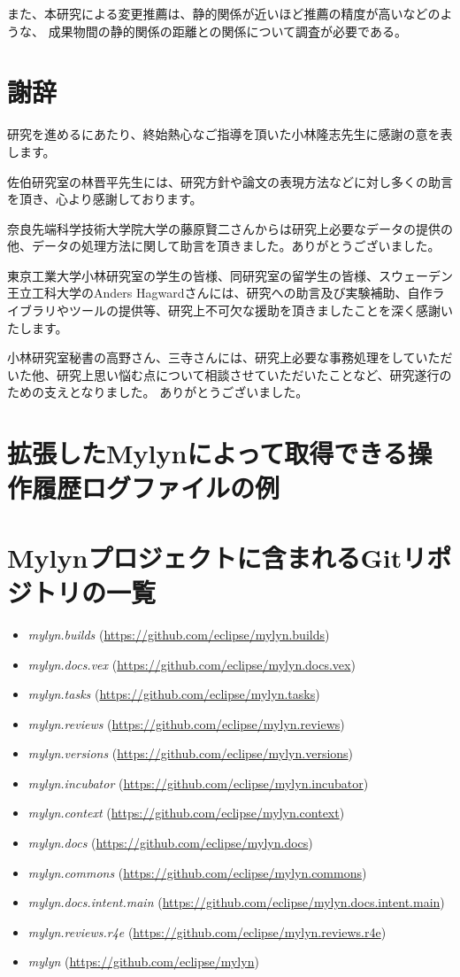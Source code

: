 \documentclass[a4paper]{jsbook}
\begin{document}
また、本研究による変更推薦は、静的関係が近いほど推薦の精度が高いなどのような、
成果物間の静的関係の距離との関係について調査が必要である。

\chapter*{謝辞}
研究を進めるにあたり、終始熱心なご指導を頂いた小林隆志先生に感謝の意を表します。

佐伯研究室の林晋平先生には、研究方針や論文の表現方法などに対し多くの助言を頂き、心より感謝しております。

奈良先端科学技術大学院大学の藤原賢二さんからは研究上必要なデータの提供の他、データの処理方法に関して助言を頂きました。ありがとうございました。

東京工業大学小林研究室の学生の皆様、同研究室の留学生の皆様、スウェーデン王立工科大学のAnders Hagwardさんには、研究への助言及び実験補助、自作ライブラリやツールの提供等、研究上不可欠な援助を頂きましたことを深く感謝いたします。

小林研究室秘書の高野さん、三寺さんには、研究上必要な事務処理をしていただいた他、研究上思い悩む点について相談させていただいたことなど、研究遂行のための支えとなりました。
ありがとうございました。

\appendix
\chapter{拡張したMylynによって取得できる操作履歴ログファイルの例}\label{mylyn_log_appendix}

\chapter{Mylynプロジェクトに含まれるGitリポジトリの一覧}\label{mylyn_repo_appendix}
\begin{itemize}
\item {\it mylyn.builds} (\url{https://github.com/eclipse/mylyn.builds})
\item {\it mylyn.docs.vex} (\url{https://github.com/eclipse/mylyn.docs.vex})
\item {\it mylyn.tasks} (\url{https://github.com/eclipse/mylyn.tasks})
\item {\it mylyn.reviews} (\url{https://github.com/eclipse/mylyn.reviews})
\item {\it mylyn.versions} (\url{https://github.com/eclipse/mylyn.versions})
\item {\it mylyn.incubator} (\url{https://github.com/eclipse/mylyn.incubator})
\item {\it mylyn.context} (\url{https://github.com/eclipse/mylyn.context})
\item {\it mylyn.docs} (\url{https://github.com/eclipse/mylyn.docs})
\item {\it mylyn.commons} (\url{https://github.com/eclipse/mylyn.commons})
\item {\it mylyn.docs.intent.main} (\url{https://github.com/eclipse/mylyn.docs.intent.main})
\item {\it mylyn.reviews.r4e} (\url{https://github.com/eclipse/mylyn.reviews.r4e})
\item {\it mylyn} (\url{https://github.com/eclipse/mylyn})
\end{itemize}


\backmatter


\end{document}
